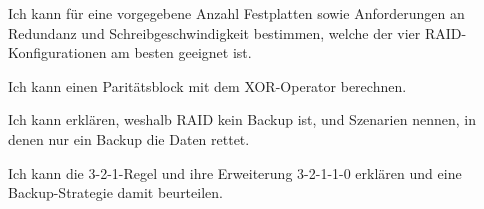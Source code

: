 \begin{todolist}
    \item Ich kann für eine vorgegebene Anzahl Festplatten sowie Anforderungen an Redundanz und Schreibgeschwindigkeit bestimmen, welche der vier \gls{RAID}-Konfigurationen am besten geeignet ist.
    \item Ich kann einen Paritätsblock mit dem \acrshort{XOR}-Operator berechnen.
    \item Ich kann erklären, weshalb \gls{RAID} kein Backup ist, und Szenarien nennen, in denen nur ein Backup die Daten rettet.
    \item Ich kann die 3-2-1-Regel und ihre Erweiterung 3-2-1-1-0 erklären und eine Backup-Strategie damit beurteilen.
\end{todolist}
